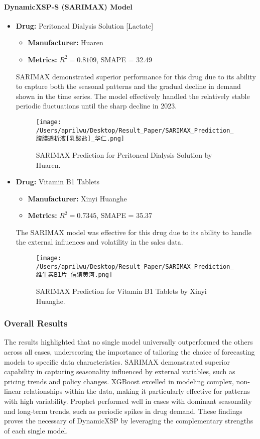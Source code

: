 \documentclass[journal]{IEEEtran}
\begin{document}
\paragraph{DynamicXSP-S (SARIMAX) Model}
\begin{itemize}
\item \textbf{Drug:} Peritoneal Dialysis Solution [Lactate]
\begin{itemize}
\item \textbf{Manufacturer:} Huaren
\item \textbf{Metrics:} $R^2 = 0.8109$, SMAPE = 32.49
\end{itemize}
SARIMAX demonstrated superior performance for this drug due to its ability to capture both the seasonal patterns and the gradual decline in demand shown in the time series. The model effectively handled the relatively stable periodic fluctuations until the sharp decline in 2023.
\begin{figure}[H]
\centering
\texttt{[image: /Users/aprilwu/Desktop/Result\_Paper/SARIMAX\_Prediction\_腹膜透析液[乳酸盐]\_华仁.png]}
\caption{SARIMAX Prediction for Peritoneal Dialysis Solution by Huaren.}
\label{fig:peritoneal}
\end{figure}
\item \textbf{Drug:} Vitamin B1 Tablets
\begin{itemize}
\item \textbf{Manufacturer:} Xinyi Huanghe
\item \textbf{Metrics:} $R^2 = 0.7345$, SMAPE = 35.37
\end{itemize}
The SARIMAX model was effective for this drug due to its ability to handle the external influences and volatility in the sales data.
\begin{figure}[H]
\centering
\texttt{[image: /Users/aprilwu/Desktop/Result\_Paper/SARIMAX\_Prediction\_维生素B1片\_信谊黄河.png]}
\caption{SARIMAX Prediction for Vitamin B1 Tablets by Xinyi Huanghe.}
\label{fig:vitaminb1}
\end{figure}
\end{itemize}

\subsubsection{Overall Results}

The results highlighted that no single model universally outperformed the others across all cases, underscoring the importance of tailoring the choice of forecasting models to specific data characteristics. SARIMAX demonstrated superior capability in capturing seasonality influenced by external variables, such as pricing trends and policy changes. XGBoost excelled in modeling complex, non-linear relationships within the data, making it particularly effective for patterns with high variability. Prophet performed well in cases with dominant seasonality and long-term trends, such as periodic spikes in drug demand. These findings proves the necessary of DynamicXSP by leveraging the complementary strengths of each single model. 
\end{document}
